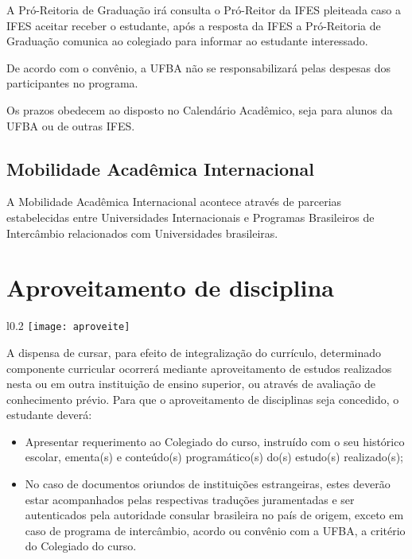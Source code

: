 A Pró-Reitoria de Graduação irá consulta o Pró-Reitor da IFES pleiteada caso a IFES aceitar receber o estudante, após a resposta da IFES a Pró-Reitoria de Graduação comunica ao colegiado para informar ao estudante interessado.

 De acordo com o convênio, a UFBA não se responsabilizará pelas despesas dos participantes no programa.
 
 Os prazos obedecem ao disposto no Calendário Acadêmico, seja para alunos da UFBA ou de outras IFES.
 
 \subsection{Mobilidade Acadêmica Internacional}
 
 A Mobilidade Acadêmica Internacional acontece através de parcerias estabelecidas entre Universidades Internacionais e Programas Brasileiros de Intercâmbio relacionados com Universidades brasileiras.

 
\section{Aproveitamento de disciplina}

\begin{wrapfigure}{l}{0.2\textwidth}
        \centering
        \texttt{[image: aproveite]}
    \end{wrapfigure}

A dispensa de cursar, para efeito de integralização do currículo, determinado componente curricular ocorrerá mediante aproveitamento de estudos realizados nesta ou em outra instituição de ensino superior, ou através de avaliação de conhecimento prévio.
Para que o aproveitamento de disciplinas seja concedido, o estudante deverá:
\begin{itemize}
    \item Apresentar requerimento ao Colegiado do curso, instruído com o seu histórico escolar, ementa(s) e conteúdo(s) programático(s) do(s) estudo(s) realizado(s);
    \item No caso de documentos oriundos de instituições estrangeiras, estes deverão estar acompanhados pelas respectivas traduções juramentadas e ser autenticados pela autoridade consular brasileira no país de origem, exceto em caso de programa de intercâmbio, acordo ou convênio com a UFBA, a critério do Colegiado do curso.
\end{itemize}

